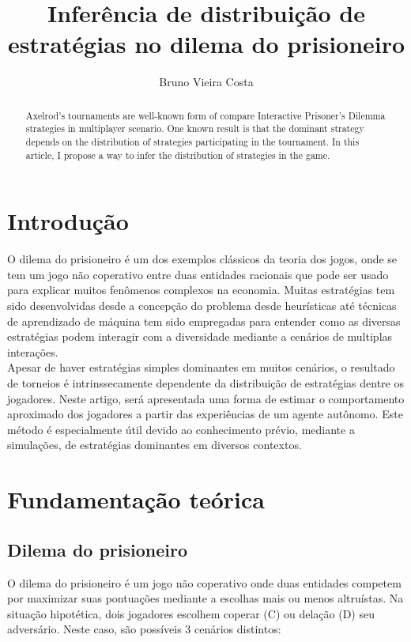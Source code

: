 \documentclass[a4paper]{article}
\title{Inferência de distribuição de estratégias no dilema do prisioneiro}
\author{Bruno Vieira Costa}
\begin{document}
	\maketitle

	\begin{abstract}
		Axelrod's tournaments are well-known form of compare Interactive Prisoner's Dilemma strategies in multiplayer scenario. One known result is that the dominant strategy depends on the distribution of strategies participating in the tournament. In this article, I propose a way to infer the distribution of strategies in the game.
	\end{abstract}

	\section{Introdução}
		O dilema do prisioneiro é um dos exemplos clássicos da teoria dos jogos, onde se tem um jogo não coperativo entre duas entidades racionais que pode ser usado para explicar muitos fenômenos complexos na economia.
		Muitas estratégias tem sido desenvolvidas desde a concepção do problema desde heurísticas até técnicas de aprendizado de máquina tem sido empregadas para entender como as diversas estratégias podem interagir com a diversidade mediante a cenários de multiplas interações.
		\\
		Apesar de haver estratégias simples dominantes em muitos cenários, o resultado de torneios é intrinssecamente dependente da distribuição de estratégias dentre os jogadores.
		Neste artigo, será apresentada uma forma de estimar o comportamento aproximado dos jogadores a partir das experiências de um agente autônomo.
		Este método é especialmente útil devido ao conhecimento prévio, mediante a simulações, de estratégias dominantes em diversos contextos.

	\section{Fundamentação teórica}
		\subsection{Dilema do prisioneiro}
			O dilema do prisioneiro é um jogo não coperativo onde duas entidades competem por maximizar suas pontuações mediante a escolhas mais ou menos altruístas.
			Na situação hipotética, dois jogadores escolhem coperar (C) ou delação (D) seu adversário. Neste caso, são possíveis 3 cenários distintos:
\end{document}
